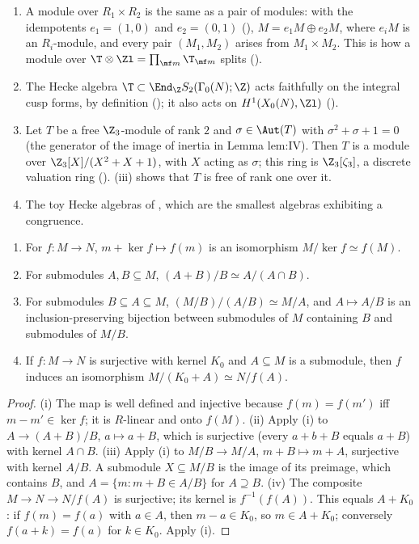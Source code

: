 \begin{example}\label{ex:modules:running}
\begin{enumerate}[label=(\alph*)]
\item A module over $R_1\times R_2$ is the same as a pair of modules: with the idempotents $e_1=(1,0)$ and $e_2=(0,1)$
(), $M=e_1M\oplus e_2M$, where $e_iM$ is an $R_i$-module, and every pair $(M_1,M_2)$ arises from
$M_1\times M_2$. This is how a module over $\T\otimes\Zl=\prod_{\mf m}\T_{\mf m}$ splits ().
\item The Hecke algebra $\T\subset\End_\Z S_2(\Gamma_0(N);\Z)$ acts faithfully on the integral cusp forms, by definition
(); it also acts on $H^1(X_0(N),\Zl)$ ().
\item Let $T$ be a free $\Z_3$-module of rank $2$ and $\sigma\in\Aut(T)$ with $\sigma^2+\sigma+1=0$ (the generator of the image of
inertia in Lemma lem:IV). Then $T$ is a module over $\Z_3[X]/(X^2+X+1)$, with $X$ acting as $\sigma$; this ring is
$\Z_3[\zeta_3]$, a discrete valuation ring (). (iii) shows that $T$ is free of rank
one over it.
\item The toy Hecke algebras of , which are the smallest algebras exhibiting a congruence.
\end{enumerate}
\end{example}

\begin{theorem}\label{thm:modules:isomorphism}
\begin{enumerate}[label=(\roman*)]
\item For $f\colon M\to N$, $m+\ker f\mapsto f(m)$ is an isomorphism $M/\ker f\simeq f(M)$.
\item For submodules $A,B\subseteq M$, $(A+B)/B\simeq A/(A\cap B)$.
\item For submodules $B\subseteq A\subseteq M$, $(M/B)/(A/B)\simeq M/A$, and $A\mapsto A/B$ is an inclusion-preserving bijection
between submodules of $M$ containing $B$ and submodules of $M/B$.
\item If $f\colon M\to N$ is surjective with kernel $K_0$ and $A\subseteq M$ is a submodule, then $f$ induces an isomorphism
$M/(K_0+A)\simeq N/f(A)$.
\end{enumerate}
\end{theorem}

\begin{proof}
(i) The map is well defined and injective because $f(m)=f(m')$ iff $m-m'\in\ker f$; it is $R$-linear and onto $f(M)$.
(ii) Apply (i) to $A\to(A+B)/B$, $a\mapsto a+B$, which is surjective (every $a+b+B$ equals $a+B$) with kernel $A\cap B$.
(iii) Apply (i) to $M/B\to M/A$, $m+B\mapsto m+A$, surjective with kernel $A/B$. A submodule $X\subseteq M/B$ is the image of
its preimage, which contains $B$, and $A=\{m:m+B\in A/B\}$ for $A\supseteq B$.
(iv) The composite $M\to N\to N/f(A)$ is surjective; its kernel is $f^{-1}(f(A))$. This equals $A+K_0$: if $f(m)=f(a)$ with
$a\in A$, then $m-a\in K_0$, so $m\in A+K_0$; conversely $f(a+k)=f(a)$ for $k\in K_0$. Apply (i).
\end{proof}

